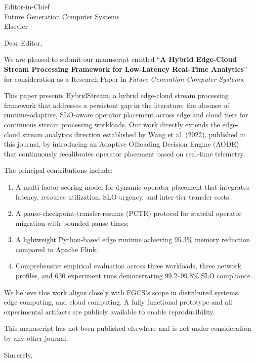 \documentclass[12pt]{letter}
\date{\today}
\begin{document}
\begin{letter}{Editor-in-Chief\\Future Generation Computer Systems\\Elsevier}

\opening{Dear Editor,}

We are pleased to submit our manuscript entitled ``\textbf{A Hybrid Edge-Cloud Stream Processing Framework for Low-Latency Real-Time Analytics}'' for consideration as a Research Paper in \textit{Future Generation Computer Systems}.

This paper presents HybridStream, a hybrid edge-cloud stream processing framework that addresses a persistent gap in the literature: the absence of runtime-adaptive, SLO-aware operator placement across edge and cloud tiers for continuous stream processing workloads. Our work directly extends the edge-cloud stream analytics direction established by Wang et al. (2022), published in this journal, by introducing an Adaptive Offloading Decision Engine (AODE) that continuously recalibrates operator placement based on real-time telemetry.

The principal contributions include:
\begin{enumerate}
    \item A multi-factor scoring model for dynamic operator placement that integrates latency, resource utilization, SLO urgency, and inter-tier transfer costs;
    \item A pause-checkpoint-transfer-resume (PCTR) protocol for stateful operator migration with bounded pause times;
    \item A lightweight Python-based edge runtime achieving 95.3\% memory reduction compared to Apache Flink;
    \item Comprehensive empirical evaluation across three workloads, three network profiles, and 630 experiment runs demonstrating 99.2--99.8\% SLO compliance.
\end{enumerate}

We believe this work aligns closely with FGCS's scope in distributed systems, edge computing, and cloud computing. A fully functional prototype and all experimental artifacts are publicly available to enable reproducibility.

This manuscript has not been published elsewhere and is not under consideration by any other journal.

\closing{Sincerely,}

\end{letter}
\end{document}
